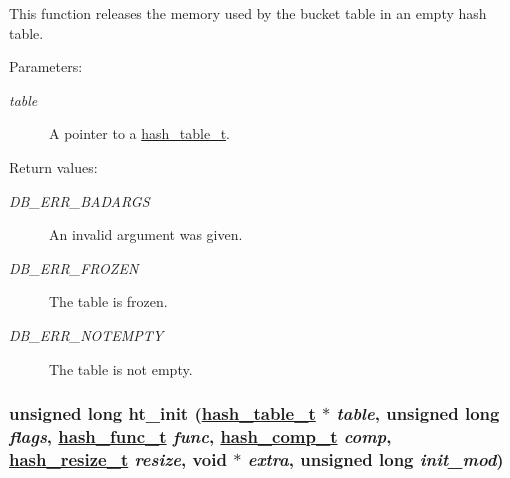 This function releases the memory used by the bucket table in an empty hash table.\begin{Desc}
\item[Parameters: ]\par
\begin{description}
\item[{\em 
table}]A pointer to a \hyperlink{group__dbprim__hash_a0}{hash\_\-table\_\-t}.\end{description}
\end{Desc}
\begin{Desc}
\item[Return values: ]\par
\begin{description}
\item[{\em 
DB\_\-ERR\_\-BADARGS}]An invalid argument was given. \item[{\em 
DB\_\-ERR\_\-FROZEN}]The table is frozen. \item[{\em 
DB\_\-ERR\_\-NOTEMPTY}]The table is not empty. \end{description}
\end{Desc}
\hypertarget{group__dbprim__hash_a6}{
\subsubsection[ht\_\-init]{\setlength{\rightskip}{0pt plus 5cm}unsigned long ht\_\-init (\hyperlink{group__dbprim__hash_a0}{hash\_\-table\_\-t} $\ast$ {\em table}, unsigned long {\em flags}, \hyperlink{group__dbprim__hash_a3}{hash\_\-func\_\-t} {\em func}, \hyperlink{group__dbprim__hash_a4}{hash\_\-comp\_\-t} {\em comp}, \hyperlink{group__dbprim__hash_a5}{hash\_\-resize\_\-t} {\em resize}, void $\ast$ {\em extra}, unsigned long {\em init\_\-mod})}}
\label{group__dbprim__hash_a6}


